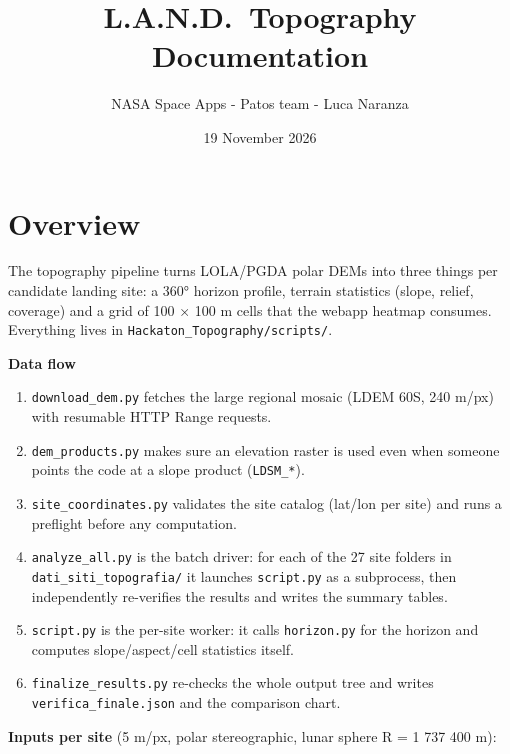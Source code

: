 \documentclass[11pt,a4paper]{article}
\title{L.A.N.D.\ Topography\\[2pt]\large Documentation}
\author{NASA Space Apps - Patos team - Luca Naranza}
\date{19 November 2026}
\providecommand{\tightlist}{\setlength{\itemsep}{0pt}\setlength{\parskip}{0pt}}
\begin{document}
\maketitle
\tableofcontents
\newpage

\hypertarget{overview}{%
\section{Overview}\label{overview}}

The topography pipeline turns LOLA/PGDA polar DEMs into three things per
candidate landing site: a 360° horizon profile, terrain statistics
(slope, relief, coverage) and a grid of 100 × 100 m cells that the
webapp heatmap consumes. Everything lives in
\texttt{Hackaton\_Topography/scripts/}.

\textbf{Data flow}

\begin{enumerate}
\def\labelenumi{\arabic{enumi}.}
\tightlist
\item
  \texttt{download\_dem.py} fetches the large regional
  mosaic (LDEM 60S, 240 m/px) with resumable HTTP Range requests.
\item
  \texttt{dem\_products.py} makes sure an elevation
  raster is used even when someone points the code at a slope product
  (\texttt{LDSM\_*}).
\item
  \texttt{site\_coordinates.py} validates the site
  catalog (lat/lon per site) and runs a preflight before any
  computation.
\item
  \texttt{analyze\_all.py} is the batch driver: for
  each of the 27 site folders in
  \texttt{dati\_siti\_topografia/} it launches
  \texttt{script.py} as a subprocess, then
  independently re-verifies the results and writes the summary tables.
\item
  \texttt{script.py} is the per-site worker: it calls
  \texttt{horizon.py} for the horizon and computes
  slope/aspect/cell statistics itself.
\item
  \texttt{finalize\_results.py} re-checks the whole
  output tree and writes \texttt{verifica\_finale.json}
  and the comparison chart.
\end{enumerate}

\textbf{Inputs per site} (5 m/px, polar stereographic, lunar sphere R =
1 737 400 m):
\end{document}
